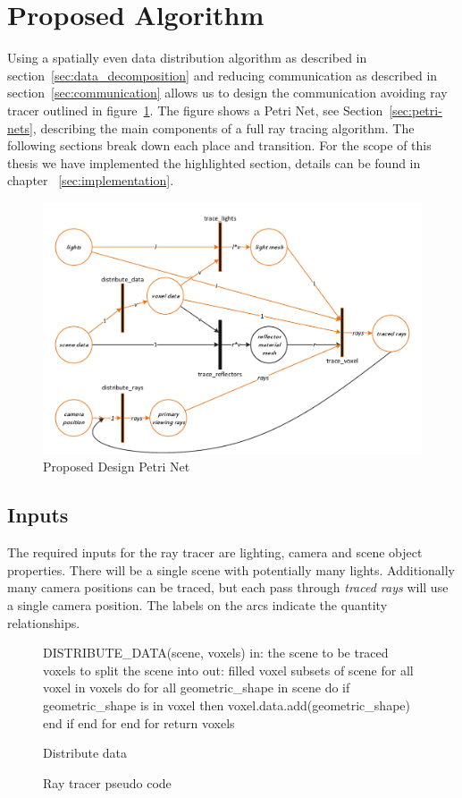 \section{Proposed Algorithm}
\label{sec:proposed-algorithm}
Using a spatially even data distribution algorithm as described in 
section~\ref{sec:data_decomposition} and reducing communication as described in 
section~\ref{sec:communication} allows us to design the communication 
avoiding ray tracer outlined in figure~\ref{fig:design}.  The figure shows a 
Petri Net, see Section~\ref{sec:petri-nets}, describing the main components of 
a full ray tracing algorithm.  The following sections break down each place and
transition.  For the scope of this thesis we have implemented the highlighted 
section, details can be found in chapter ~\ref{sec:implementation}.

\begin{figure}[!htb]
\centering
  \includegraphics[width=\linewidth]{drawings/Design.pdf}
\caption{Proposed Design Petri Net}
\label{fig:design}
\end{figure}

\subsection{Inputs}
The required inputs for the ray tracer are lighting, camera and scene object 
properties.  There will be a single scene with potentially many lights.  
Additionally many camera positions can be traced, but each pass through 
\emph{traced rays} will use a single camera position.  The labels on the arcs 
indicate the quantity relationships.

\begin{figure}[!htb]
\begin{algorithm}
DISTRIBUTE_DATA(scene, voxels)
  in:  the scene to be traced
       voxels to split the scene into
  out: filled voxel subsets of scene
  for all voxel in voxels do
    for all geometric_shape in scene do
      if geometric_shape is in voxel then
        voxel.data.add(geometric_shape)
      end if
    end for
  end for
return voxels
\end{algorithm}

Distribute data
\endminipage\hfill
\caption{Ray tracer pseudo code}
\label{fig:ray_tracing_1}
\end{figure}

